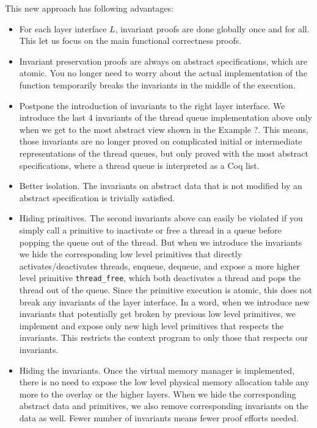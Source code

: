 This new approach has following advantages:
\begin{itemize}
\item For each layer interface $L$, invariant proofs are done globally once and for all.
This let us focus on the main functional correctness proofs.
\item Invariant preservation proofs are always on abstract specifications, which
are atomic. You no longer need to worry about the actual implementation of the
function temporarily breaks the invariants in the middle of the execution.
\item Postpone the introduction of invariants to the right layer interface.
We introduce the last 4 invariants of the thread queue implementation above
only when we get to the most abstract view shown in the Example ?.
This means, those invariants are no longer proved on complicated initial or
intermediate representations of the thread queues, but only proved with
the most abstract specifications, where a thread queue is interpreted as a
Coq list.
\item Better isolation. The invariants on abstract data that is not modified
by an abstract specification is trivially satisfied.
\item Hiding primitives. The second invariants above can easily be violated
if you simply call a primitive to inactivate or free a thread in a queue
before popping the queue out of the thread. But when we introduce the
invariants we hide the corresponding low level primitives that directly
activates/deactivates threads, enqueue, dequeue, and expose a more higher
level primitive \verb+thread_free+, which both deactivates a thread and
pops the thread out of the queue. Since the primitive execution is atomic,
this does not break any invariants of the layer interface. In a word, when we introduce
new invariants that potentially get broken by previous low level primitives,
we implement and expose only new high level primitives that respects the
invariants. This restricts the context program to only those that respects
our invariants.
\item Hiding the invariants. Once the virtual memory manager is implemented,
there is no need to expose the low level physical memory allocation table
any more to the overlay or the higher layers. When we hide the corresponding abstract
data and primitives, we also remove corresponding invariants on the data
as well. Fewer number of invariants means fewer proof efforts needed.
\end{itemize}




